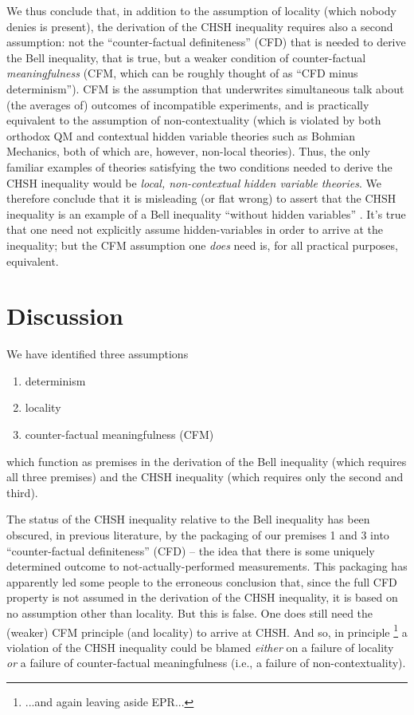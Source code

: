 \documentclass[aps,prc,onecolumn,12pt]{revtex4-2}
\begin{document}
We thus conclude that, in addition to the assumption of locality
(which nobody denies is present), the derivation of the CHSH inequality
requires also a second assumption:  not the ``counter-factual
definiteness'' (CFD) that is needed to derive the Bell inequality, that is
true, but a weaker condition of counter-factual \emph{meaningfulness}
(CFM, which can be roughly thought of as ``CFD minus determinism'').
CFM is the assumption that underwrites simultaneous talk about (the
averages of) outcomes of incompatible experiments, and is practically
equivalent to the assumption of non-contextuality (which is violated
by both orthodox QM and contextual hidden variable theories such
as Bohmian Mechanics, both of which are, however, non-local theories).
Thus, the only familiar examples of theories satisfying the two
conditions needed to derive the CHSH inequality would be \emph{local,
non-contextual hidden variable theories}.  We therefore conclude that
it is misleading (or flat wrong) to assert that the CHSH inequality is
an example of a Bell inequality ``without hidden
variables'' \cite{eberhard}.   It's true that one need not explicitly assume
hidden-variables in order to arrive at the inequality; but the CFM
assumption one \emph{does} need is, for all practical purposes,
equivalent.



\section{Discussion}

We have identified three assumptions
\begin{enumerate}
\item determinism
\item locality
\item counter-factual meaningfulness (CFM)
\end{enumerate}
which function as premises in the derivation of the Bell inequality
(which requires all three premises) and the CHSH inequality (which
requires only the second and third).

The status of the CHSH inequality relative to the Bell inequality has
been obscured, in previous literature, by the packaging of our
premises 1 and 3 into ``counter-factual definiteness'' (CFD) -- the
idea that there is some uniquely determined outcome to
not-actually-performed measurements.  This packaging has apparently
led some people to the erroneous conclusion that, since the full CFD
property is not assumed in the derivation of the CHSH inequality, it
is based on no assumption other than locality.  But this is false.
One does still need the (weaker) CFM principle (and locality) to
arrive at CHSH.  And so, in principle \footnote{...and again leaving
  aside EPR...} a violation of the CHSH inequality could be blamed
\emph{either} on a failure of locality \emph{or} a failure of
counter-factual meaningfulness (i.e., a failure of non-contextuality).
\end{document}
